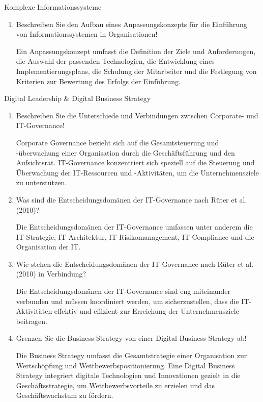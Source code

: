 \documentclass{article}
\begin{document}
\begin{exercise}{Komplexe Informationssysteme}
\begin{enumerate}
    \item Beschreiben Sie den Aufbau eines Anpassungskonzepts für die Einführung von Informationssystemen in Organisationen!
          \begin{solution}
            Ein Anpassungskonzept umfasst die Definition der Ziele und Anforderungen, die Auswahl der passenden Technologien, die Entwicklung eines Implementierungsplans, die Schulung der Mitarbeiter und die Festlegung von Kriterien zur Bewertung des Erfolgs der Einführung.
          \end{solution}
  \end{enumerate}
\end{exercise}

\begin{exercise}{Digital Leadership \& Digital Business Strategy}
  \begin{enumerate}
    \item Beschreiben Sie die Unterschiede und Verbindungen zwischen Corporate- und IT-Governance!
          \begin{solution}
            Corporate Governance bezieht sich auf die Gesamtsteuerung und -überwachung einer Organisation durch die Geschäftsführung und den Aufsichtsrat. IT-Governance konzentriert sich speziell auf die Steuerung und Überwachung der IT-Ressourcen und -Aktivitäten, um die Unternehmensziele zu unterstützen.
          \end{solution}

    \item Was sind die Entscheidungsdomänen der IT-Governance nach Rüter et al. (2010)?
          \begin{solution}
            Die Entscheidungsdomänen der IT-Governance umfassen unter anderem die IT-Strategie, IT-Architektur, IT-Risikomanagement, IT-Compliance und die Organisation der IT.
          \end{solution}

    \item Wie stehen die Entscheidungsdomänen der IT-Governance nach Rüter et al. (2010) in Verbindung?
          \begin{solution}
            Die Entscheidungsdomänen der IT-Governance sind eng miteinander verbunden und müssen koordiniert werden, um sicherzustellen, dass die IT-Aktivitäten effektiv und effizient zur Erreichung der Unternehmensziele beitragen.
          \end{solution}

    \item Grenzen Sie die Business Strategy von einer Digital Business Strategy ab!
          \begin{solution}
            Die Business Strategy umfasst die Gesamtstrategie einer Organisation zur Wertschöpfung und Wettbewerbspositionierung. Eine Digital Business Strategy integriert digitale Technologien und Innovationen gezielt in die Geschäftsstrategie, um Wettbewerbsvorteile zu erzielen und das Geschäftswachstum zu fördern.
          \end{solution}


\end{enumerate}
\end{exercise}
\end{document}
